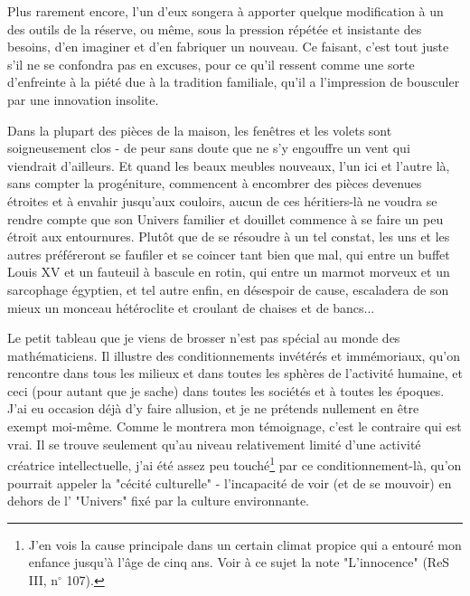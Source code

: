 Plus rarement encore, l'un d'eux songera à apporter quelque modification à un des outils de la réserve, ou même, sous la pression répétée et insistante des besoins, d'en imaginer et d'en fabriquer un nouveau. Ce faisant, c'est tout juste s'il ne se confondra pas en excuses, pour ce qu'il ressent comme une sorte d'enfreinte à la piété due à la tradition familiale, qu'il a l'impression de bousculer par une innovation insolite.

Dans la plupart des pièces de la maison, les fenêtres et les volets sont soigneusement clos - de peur sans doute que ne s'y engouffre un vent qui viendrait d'ailleurs. Et quand les beaux meubles nouveaux, l'un ici et l'autre là, sans compter la progéniture, commencent à encombrer des pièces devenues étroites et à envahir jusqu'aux couloirs, aucun de ces héritiers-là ne voudra se rendre compte que son Univers familier et douillet commence à se faire un peu étroit aux entournures. Plutôt que de se résoudre à un tel constat, les uns et les autres préféreront se faufiler et se coincer tant bien que mal, qui entre un buffet Louis XV et un fauteuil à bascule en rotin, qui entre un marmot morveux et un sarcophage égyptien, et tel autre enfin, en désespoir de cause, escaladera de son mieux un monceau hétéroclite et croulant de chaises et de bancs...

Le petit tableau que je viens de brosser n'est pas spécial au monde des mathématiciens. Il illustre des conditionnements invétérés et immémoriaux, qu'on rencontre dans tous les milieux et dans toutes les sphères de l'activité humaine, et ceci (pour autant que je sache) dans toutes les sociétés et à toutes les époques. J'ai eu occasion déjà d'y faire allusion, et je ne prétends nullement en être exempt moi-même. Comme le montrera mon témoignage, c'est le contraire qui est vrai. Il se trouve seulement qu'au niveau relativement limité d'une activité créatrice intellectuelle, j'ai été assez peu touché\footnote{J'en vois la cause principale dans un certain climat propice qui a entouré mon enfance jusqu'à l'âge de cinq ans. Voir à ce sujet la note "L'innocence" (ReS III, n$^{\circ}$ 107).} par ce conditionnement-là, qu'on pourrait appeler la "cécité culturelle" - l'incapacité de voir (et de se mouvoir) en dehors de l' "Univers" fixé par la culture environnante.

